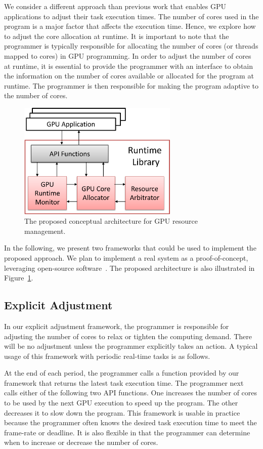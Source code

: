 \documentclass{acm_proc_article-sp}
\begin{document}
We consider a different approach than previous work that enables GPU
applications to adjust their task execution times.
The number of cores used in the program is a major
factor that affects the execution time. Hence, we explore how to
adjust the core allocation at runtime.
It is important to note that the programmer is typically responsible for
allocating the number of cores (or threads mapped to cores) in GPU
programming.
In order to adjust the number of cores at runtime, it is essential to
provide the programmer with an interface to obtain the information on
the number of cores available or allocated for the program at runtime.
The programmer is then responsible for making the program adaptive to
the number of cores.

\begin{figure}[t]
\includegraphics[width=3.0in]{architecture.eps}
\caption{The proposed conceptual architecture for GPU resource management.} 
\label{fig_arch}
\end{figure}

In the following, we present two frameworks that could be used to 
implement the proposed approach. 
We plan to implement a real
system as a proof-of-concept, leveraging open-source
software~\cite{Kato_OSPERT11}. The proposed architecture is also 
illustrated in Figure~\ref{fig_arch}.

\subsection{Explicit Adjustment}

In our explicit adjustment framework, the programmer is
responsible for adjusting the number of cores to relax or tighten
the computing demand.
There will be no adjustment unless the programmer explicitly takes an
action.
A typical usage of this framework with periodic real-time tasks is as
follows.

At the end of each period, the programmer calls a function provided
by our framework that returns the latest task execution time.
The programmer next calls either of the following two API functions.
One increases the number of cores to be used by the next GPU execution 
to speed up the program.
The other decreases it to slow down the program.
This framework is usable in practice because the programmer often knows the
desired task execution time to meet the frame-rate or deadline.
It is also flexible in that the programmer can determine when to
increase or decrease the number of cores.
\end{document}
